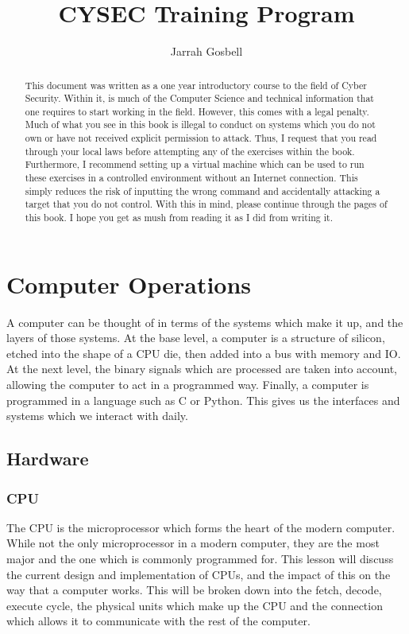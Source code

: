 \documentclass[a4paper,11pt]{report}
\author{Jarrah Gosbell}
\title{CYSEC Training Program}
\begin{document}
\maketitle
\tableofcontents
\begin{abstract}
	This document was written as a one year introductory course to the field of Cyber Security. 
	Within it, is much of the Computer Science and technical information that one requires to start working in the field. 
	However, this comes with a legal penalty. 
	Much of what you see in this book is illegal to conduct on systems which you do not own or have not received explicit permission to attack. 
	Thus, I request that you read through your local laws before attempting any of the exercises within the book. 
	Furthermore, I recommend setting up a virtual machine which can be used to run these exercises in a controlled environment without an Internet connection. 
	This simply reduces the risk of inputting the wrong command and accidentally attacking a target that you do not control. 
	With this in mind, please continue through the pages of this book. 
	I hope you get as mush from reading it as I did from writing it. 
\end{abstract}
\chapter{Computer Operations}
	\label{ch:ComputerOperations}
	A computer can be thought of in terms of the systems which make it up, and the layers of those systems.
	At the base level, a computer is a structure of silicon, etched into the shape of a CPU die, then added into a bus with memory and IO.
	At the next level, the binary signals which are processed are taken into account, allowing the computer to act in a programmed way. 
	Finally, a computer is programmed in a language such as C or Python. This gives us the interfaces and systems which we interact with daily. 
	\section{Hardware}
		\subsection{CPU} 
			The CPU is the microprocessor which forms the heart of the modern computer. 
			While not the only microprocessor in a modern computer, they are the most major and the one which is commonly programmed for. 
			This lesson will discuss the current design and implementation of CPUs, and the impact of this on the way that a computer works. 
			This will be broken down into the fetch, decode, execute cycle, the physical units which make up the CPU and the connection which allows it to communicate with the rest of the computer. 
\end{document}
